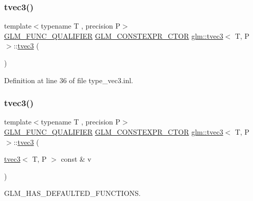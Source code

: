 \subsubsection{\texorpdfstring{tvec3()}{tvec3()}\hspace{0.1cm}{\footnotesize\ttfamily [1/23]}}
{\footnotesize\ttfamily template$<$typename T , precision P$>$ \\
\mbox{\hyperlink{setup_8hpp_a33fdea6f91c5f834105f7415e2a64407}{G\+L\+M\+\_\+\+F\+U\+N\+C\+\_\+\+Q\+U\+A\+L\+I\+F\+I\+ER}} \mbox{\hyperlink{setup_8hpp_ad34178a09666081abdb573c14d1f4a5a}{G\+L\+M\+\_\+\+C\+O\+N\+S\+T\+E\+X\+P\+R\+\_\+\+C\+T\+OR}} \mbox{\hyperlink{structglm_1_1tvec3}{glm\+::tvec3}}$<$ T, P $>$\+::\mbox{\hyperlink{structglm_1_1tvec3}{tvec3}} (\begin{DoxyParamCaption}{ }\end{DoxyParamCaption})}



Definition at line 36 of file type\+\_\+vec3.\+inl.

\mbox{\label{structglm_1_1tvec3_ad648640117d2609264432d444b587833}} 
\subsubsection{\texorpdfstring{tvec3()}{tvec3()}\hspace{0.1cm}{\footnotesize\ttfamily [2/23]}}
{\footnotesize\ttfamily template$<$typename T , precision P$>$ \\
\mbox{\hyperlink{setup_8hpp_a33fdea6f91c5f834105f7415e2a64407}{G\+L\+M\+\_\+\+F\+U\+N\+C\+\_\+\+Q\+U\+A\+L\+I\+F\+I\+ER}} \mbox{\hyperlink{setup_8hpp_ad34178a09666081abdb573c14d1f4a5a}{G\+L\+M\+\_\+\+C\+O\+N\+S\+T\+E\+X\+P\+R\+\_\+\+C\+T\+OR}} \mbox{\hyperlink{structglm_1_1tvec3}{glm\+::tvec3}}$<$ T, P $>$\+::\mbox{\hyperlink{structglm_1_1tvec3}{tvec3}} (\begin{DoxyParamCaption}\item[{\mbox{\hyperlink{structglm_1_1tvec3}{tvec3}}$<$ T, P $>$ const \&}]{v }\end{DoxyParamCaption})}



G\+L\+M\+\_\+\+H\+A\+S\+\_\+\+D\+E\+F\+A\+U\+L\+T\+E\+D\+\_\+\+F\+U\+N\+C\+T\+I\+O\+NS. 




